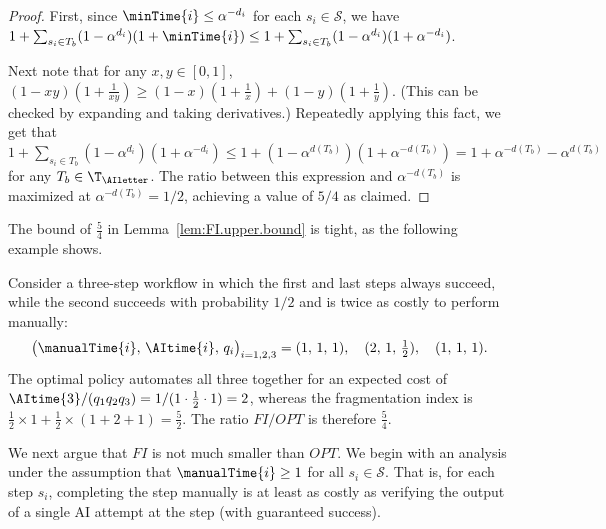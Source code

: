 \begin{proof}
First, since $\minTime{i} \leq \alpha^{-d_i}$ for each $s_i \in \mathcal{S}$, we have $1 + \sum_{s_i \in T_b}(1-\alpha^{d_i})(1+\minTime{i}) \leq 1 + \sum_{s_i \in T_b}(1-\alpha^{d_i})(1+\alpha^{-d_i})$.

Next note that for any $x,y\in [0,1]$, $(1-xy)(1+\tfrac{1}{xy}) \geq (1-x)(1+\tfrac{1}{x}) + (1-y)(1+\tfrac{1}{y})$.
(This can be checked by expanding and taking derivatives.)
Repeatedly applying this fact, we get that $1 + \sum_{s_i \in T_b}(1-\alpha^{d_i})(1+\alpha^{-d_i}) \leq 1 + (1-\alpha^{d(T_b)})(1+\alpha^{-d(T_b)}) = 1 + \alpha^{-d(T_b)} - \alpha^{d(T_b)}$ for any $T_b \in \T_{\AIletter}$.
The ratio between this expression and $\alpha^{-d(T_b)}$ is maximized at $\alpha^{-d(T_b)} = 1/2$, achieving a value of $5/4$ as claimed.
\end{proof}

The bound of $\tfrac{5}{4}$ in Lemma~\ref{lem:FI.upper.bound} is tight, as the following example shows.

\begin{example}
\label{ex:FI.tight}
Consider a three-step workflow in which the first and last steps always succeed, while the second succeeds with probability $1/2$ and is twice as costly to perform manually:
\[ \bigl(\manualTime{i},\, \AItime{i},\, q_i\bigr)_{i=1,2,3} = (1,\,1,\,1),\quad (2,\,1,\,\tfrac12),\quad (1,\,1,\,1). \]
The optimal policy automates all three together for an expected cost of $\AItime{3}/(q_1 q_2 q_3) = 1/(1 \cdot \tfrac12 \cdot 1) = 2$, whereas the fragmentation index is $\tfrac12 \times 1 + \tfrac12 \times (1+2+1) = \tfrac52$.
The ratio $FI/OPT$ is therefore $\tfrac54$.
\end{example}

We next argue that $FI$ is not much smaller than $OPT$.
We begin with an analysis under the assumption that $\manualTime{i} \geq 1$ for all $s_i \in \mathcal{S}$.
That is, for each step $s_i$, completing the step manually is at least as costly as verifying the output of a single AI attempt at the step (with guaranteed success).

